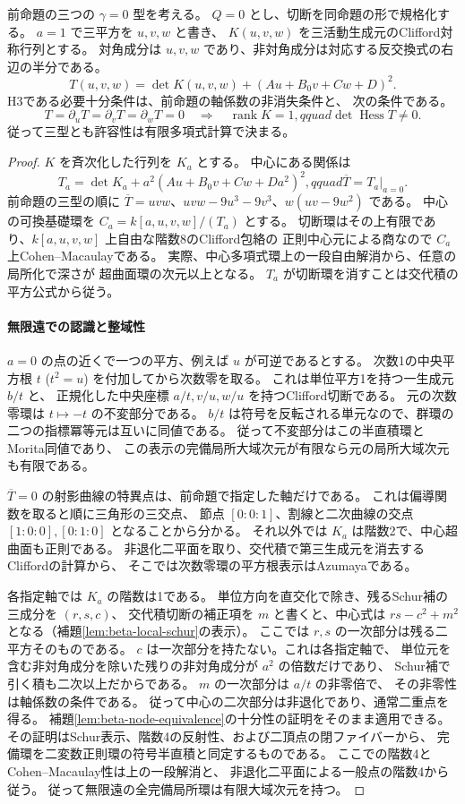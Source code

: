 \begin{theorem}\label{thm:cubic-CY-three-alpha-symmetric-singular-admissibility}
前命題の三つの $\gamma=0$ 型を考える。
$Q=0$ とし、切断を同命題の形で規格化する。
$a=1$ で三平方を $u,v,w$ と書き、
$K(u,v,w)$ を三活動生成元のClifford対称行列とする。
対角成分は $u,v,w$ であり、非対角成分は対応する反交換式の右辺の半分である。
\[
 T(u,v,w)=\det K(u,v,w)+(A u+B_0 v+C w+D)^2 .
\]
H3である必要十分条件は、前命題の軸係数の非消失条件と、
次の条件である。
\[
 T=\partial_uT=\partial_vT=\partial_wT=0
 \quad\Longrightarrow\quad
 \operatorname{rank}K=1,qquad \det\operatorname{Hess}T\ne0 .
\]
従って三型とも許容性は有限多項式計算で決まる。
\end{theorem}
\begin{proof}
$K$ を斉次化した行列を $K_a$ とする。
中心にある関係は
\[
 T_a=\det K_a+a^2(Au+B_0v+Cw+Da^2)^2,qquad
 \overline T=T_a|_{a=0}.
\]
前命題の三型の順に
$\overline T=uvw$、$uvw-9u^3-9v^3$、$w(uv-9w^2)$ である。
中心の可換基礎環を $C_a=k[a,u,v,w]/(T_a)$ とする。
切断環はその上有限であり、$k[a,u,v,w]$ 上自由な階数8のClifford包絡の
正則中心元による商なので $C_a$ 上Cohen--Macaulayである。
実際、中心多項式環上の一段自由解消から、任意の局所化で深さが
超曲面環の次元以上となる。
$T_a$ が切断環を消すことは交代積の平方公式から従う。

\paragraph{無限遠での認識と整域性}
$a=0$ の点の近くで一つの平方、例えば $u$ が可逆であるとする。
次数1の中央平方根 $t$ ($t^2=u$) を付加してから次数零を取る。
これは単位平方1を持つ一生成元 $b/t$ と、
正規化した中央座標 $a/t,v/u,w/u$ を持つClifford切断である。
元の次数零環は $t\mapsto-t$ の不変部分である。
$b/t$ は符号を反転される単元なので、群環の二つの指標冪等元は互いに同値である。
従って不変部分はこの半直積環とMorita同値であり、
この表示の完備局所大域次元が有限なら元の局所大域次元も有限である。

$\overline T=0$ の射影曲線の特異点は、前命題で指定した軸だけである。
これは偏導関数を取ると順に三角形の三交点、
節点 $[0:0:1]$、割線と二次曲線の交点 $[1:0:0],[0:1:0]$ となることから分かる。
それ以外では $K_a$ は階数2で、中心超曲面も正則である。
非退化二平面を取り、交代積で第三生成元を消去するCliffordの計算から、
そこでは次数零環の平方根表示はAzumayaである。

各指定軸では $K_a$ の階数は1である。
単位方向を直交化で除き、残るSchur補の三成分を $(r,s,c)$、
交代積切断の補正項を $m$ と書くと、中心式は
$rs-c^2+m^2$ となる（補題\ref{lem:beta-local-schur}の表示）。
ここでは $r,s$ の一次部分は残る二平方そのものである。
$c$ は一次部分を持たない。これは各指定軸で、
単位元を含む非対角成分を除いた残りの非対角成分が $a^2$ の倍数だけであり、
Schur補で引く積も二次以上だからである。
$m$ の一次部分は $a/t$ の非零倍で、
その非零性は軸係数の条件である。
従って中心の二次部分は非退化であり、通常二重点を得る。
補題\ref{lem:beta-node-equivalence}の十分性の証明をそのまま適用できる。
その証明はSchur表示、階数4の反射性、および二頂点の閉ファイバーから、
完備環を二変数正則環の符号半直積と同定するものである。
ここでの階数4とCohen--Macaulay性は上の一段解消と、
非退化二平面による一般点の階数4から従う。
従って無限遠の全完備局所環は有限大域次元を持つ。


\end{proof}
